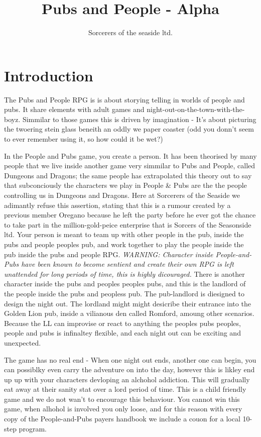 \documentclass{book}
\title{Pubs and People - Alpha}
\author{Sorcerers of the seaside ltd.}
\begin{document}
\maketitle

\section{Introduction}
The Pubs and People RPG is is about storying telling in worlds of people and pubs. It share elements with adult games and night-out-on-the-town-with-the-boyz. Simmilar to those games this is driven by imagination - It's about picturing the twoering stein glass beneith an oddly we paper coaster (odd you donn't seem to ever remember using it, so how could it be wet?)

In the People and Pubs game, you create a person. It has been theorised by many people that we live inside another game very simmilar to Pubs and People, called Dungeons and Dragons; the same people has extrapolated this theory out to say that subconciously the characters we play in People \& Pubs are the the people controlling us in Dungeons and Dragons. Here at Sorcerers of the Seaside we adimantly refuse this assertion, stating that this is a rumour created by a previous member Oregano because he left the party before he ever got the chance to take part in the million-gold-peice enterprise that is Sorcers of the Seasonside ltd. Your person is meant to team up with other people in the pub, inside the pubs and people peoples pub, and work together to play the people inside the pub inside the pubs and people RPG.
\newline
\newline
\emph{WARNING: Character inside People-and-Pubs have been known to become sentient and create their own RPG is left unattended for long periods of time, this is highly dicouraged.}
\newline
\newline
There is another character inside the pubs and peoples peoples pubs, and this is the landlord of the people inside the pubs and peopless pub. The pub-landlord is diesigned to design the night out. The lordland might might desicribe their entrance into the Golden Lion pub, inside a vilianous den called Romford, amoung other scenarios. Because the LL can improvise or react to anything the peoples pubs peoples, people and pubs is infinaltey flexible, and each night out can be exciting and unexpected.

The game has no real end - When one night out ends, another one can begin, you can possiblky even carry the adventure on into the day, however this is likley end up up with your characters devloping an alchohol addiction. This will gradually eat away at their sanity stat over a lord period of time. This is a child friendly game and we do not wan't to encourage this behaviour. You cannot win this game, when alhohol is involved you only loose, and for this reason with every copy of the People-and-Pubs payers handbook we include a couon for a local 10-step program.
\end{document}
